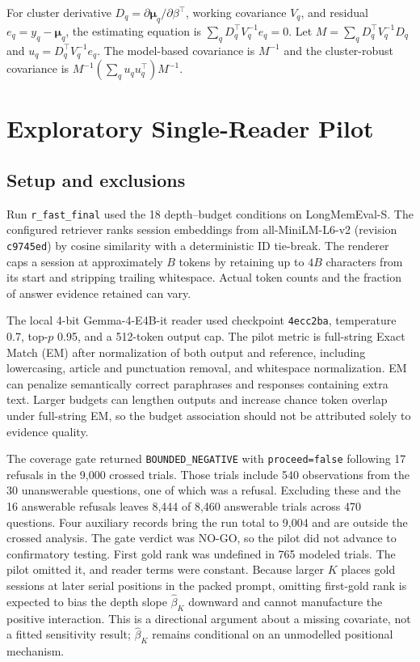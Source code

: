 For cluster derivative $D_q=\partial\boldsymbol\mu_q/\partial\beta^\top$, working covariance $V_q$, and residual $e_q=y_q-\boldsymbol\mu_q$, the estimating equation is $\sum_q D_q^\top V_q^{-1}e_q=0$. Let $M=\sum_qD_q^\top V_q^{-1}D_q$ and $u_q=D_q^\top V_q^{-1}e_q$. The model-based covariance is $M^{-1}$ and the cluster-robust covariance is $M^{-1}(\sum_q u_qu_q^\top)M^{-1}$.

\section{Exploratory Single-Reader Pilot}
\label{sec:pilot}

\subsection{Setup and exclusions}

Run \texttt{r\_fast\_final} used the 18 depth--budget conditions on LongMemEval-S. The configured retriever ranks session embeddings from all-MiniLM-L6-v2 (revision \texttt{c9745ed}) by cosine similarity with a deterministic ID tie-break. The renderer caps a session at approximately $B$ tokens by retaining up to $4B$ characters from its start and stripping trailing whitespace. Actual token counts and the fraction of answer evidence retained can vary.

The local 4-bit Gemma-4-E4B-it reader used checkpoint \texttt{4ecc2ba}, temperature 0.7, top-$p$ 0.95, and a 512-token output cap. The pilot metric is full-string Exact Match (EM) after normalization of both output and reference, including lowercasing, article and punctuation removal, and whitespace normalization. EM can penalize semantically correct paraphrases and responses containing extra text. Larger budgets can lengthen outputs and increase chance token overlap under full-string EM, so the budget association should not be attributed solely to evidence quality.

The coverage gate returned \texttt{BOUNDED\_NEGATIVE} with \texttt{proceed=false} following 17 refusals in the 9,000 crossed trials. Those trials include 540 observations from the 30 unanswerable questions, one of which was a refusal. Excluding these and the 16 answerable refusals leaves 8,444 of 8,460 answerable trials across 470 questions. Four auxiliary records bring the run total to 9,004 and are outside the crossed analysis. The gate verdict was NO-GO, so the pilot did not advance to confirmatory testing. First gold rank was undefined in 765 modeled trials. The pilot omitted it, and reader terms were constant. Because larger $K$ places gold sessions at later serial positions in the packed prompt, omitting first-gold rank is expected to bias the depth slope $\hat\beta_K$ downward and cannot manufacture the positive interaction. This is a directional argument about a missing covariate, not a fitted sensitivity result; $\hat\beta_K$ remains conditional on an unmodelled positional mechanism.

